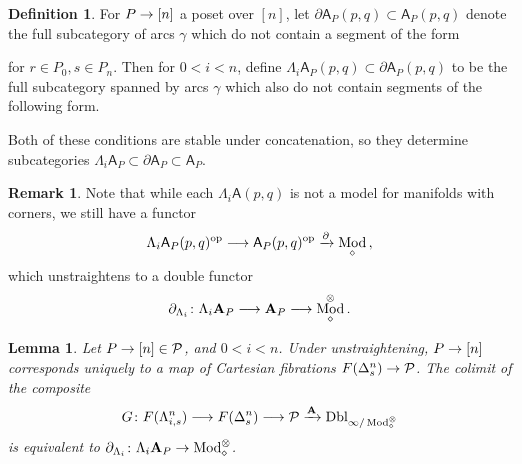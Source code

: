 \documentclass[10pt]{amsart}
\numberwithin{equation}{section}
\newtheorem{lem}[prop]{Lemma}
\theoremstyle{definition}
\newtheorem{definition}[prop]{Definition}
\newtheorem{rem}[prop]{Remark}
\DeclareMathOperator{\Mod}{Mod}
\DeclareMathOperator{\op}{op}
\newcommand{\Horn}{\Lambda}
\newcommand{\cP}{\mathcal{P}}
\newcommand{\bfA}{\mathbf{A}}
\newcommand{\sfA}{\mathsf{A}}
\newcommand{\Dbl}{\mathrm{Dbl}}
\newcommand{\del}{\partial}
\renewcommand{\to}{\mathchoice{\longrightarrow}{\rightarrow}{}{}}
\begin{document}
\begin{definition}\label{def:del_A_p}
	For $P\to [n]$ a poset over $[n]$, let $\del \sfA_{P}(p,q) \subset \sfA_{P}(p,q)$ denote the full subcategory of arcs $\gamma$ which do not contain a segment of the form
	\begin{center}
	\end{center}
	for $r\in P_{0}, s\in P_{n}$. Then for $0<i<n$, define $\Horn_{i} \sfA_{P}(p,q) \subset \del \sfA_{P}(p,q)$ to be the full subcategory spanned by arcs $\gamma$ which also do not contain segments of the following form.
	\begin{center}
	\end{center}
	Both of these conditions are stable under concatenation, so they determine subcategories $\Horn_{i}\sfA_{P}\subset \del\sfA_{P} \subset\sfA_{P}$.
\end{definition}
\begin{rem}\label{rem:horn_double_functor}
	Note that while each $\Horn_{i}\sfA(p,q)$ is not a model for manifolds with corners, we still have a functor
	\begin{align*}
		\Horn_{i}\sfA_{P}(p,q)^{\op} \to \sfA_{P}(p,q)^{\op} \xrightarrow{\del} \Mod_{\diamond} \, ,
	\end{align*}
	which unstraightens to a double functor
	\begin{align*}
		\del_{\Horn_{i}} \colon  \Horn_{i}\bfA_{P} \to \bfA_{P} \to \Mod_{\diamond}^{\otimes}.
	\end{align*}
\end{rem}
\begin{lem}\label{lem:horn_A_as_colimit}
	Let $P \to [n] \in \cP$, and $0<i<n$. Under unstraightening, $P\to [n]$ corresponds uniquely to a map of Cartesian fibrations $F(\Delta^{n}_{s}) \to \cP$.
  The colimit of the composite
	\begin{align*}
		G\colon F(\Horn_{i,s}^{n}) \to F(\Delta^{n}_{s}) \to \cP \xrightarrow{\bfA} \Dbl_{\infty/\Mod_{\diamond}^{\otimes}}
	\end{align*}
	is equivalent to $\del_{\Horn_{i}}\colon \Horn_{i}\bfA_{P} \to \Mod_{\diamond}^{\otimes}$.
\end{lem}
\end{document}
